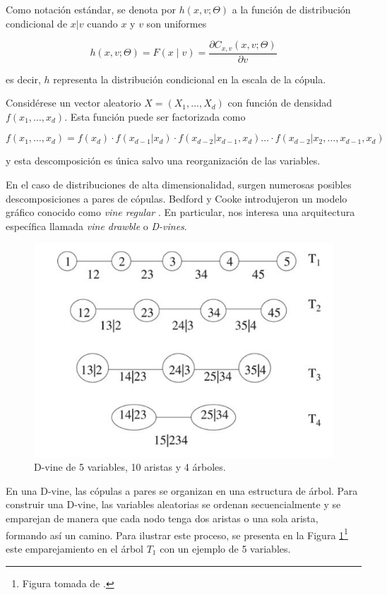 Como notación estándar, se denota por $h(x, v; \Theta)$ a la función de distribución condicional de $x|v$ cuando $x$ y $v$ son uniformes

\begin{equation}\label{funH}
    h(x, v; \Theta) = F(x \mid v)=\frac{\partial C_{x, v}(x, v; \Theta)}{\partial v}
\end{equation}

es decir, $h$ representa la distribución condicional en la escala de la cópula.

Considérese un vector aleatorio $X = (X_1, \dots, X_d)$ con función de densidad $f(x_1, \dots, x_d)$. Esta función puede ser factorizada como

\begin{equation}\label{fact1}
    f(x_1, \dots, x_d) = f(x_d) \cdot f(x_{d-1}|x_d) \cdot f(x_{d-2} | x_{d-1}, x_{d}) \dots \cdot  f(x_{d-2} | x_{2}, \dots, x_{d-1}, x_{d})
\end{equation}

 y esta descomposición es única salvo una reorganización de las variables.

En el caso de distribuciones de alta dimensionalidad, surgen numerosas posibles descomposiciones a pares de cópulas. Bedford y Cooke  introdujeron un modelo gráfico conocido como \textit{vine regular} \cite{Bedford2001}. En particular, nos interesa una arquitectura específica llamada \textit{vine drawble} o \textit{D-vines}.

\begin{figure}[H]
    \centering
    \includegraphics[width = 0.6 \textwidth]{Imagenes/Dvine5var.png}
    \caption{D-vine de 5 variables, 10 aristas y 4 árboles.}
    \label{fig:Dvine5}
\end{figure}

En una D-vine, las cópulas a pares se organizan en una estructura de árbol. Para construir una D-vine, las variables aleatorias se ordenan secuencialmente y se emparejan de manera que cada nodo tenga dos aristas o una sola arista, formando así un camino. Para ilustrar este proceso, se presenta en la Figura \ref{fig:Dvine5}\footnote{Figura tomada de \cite{PairCopula}.} este emparejamiento en el árbol $T_1$ con un ejemplo de 5 variables.

